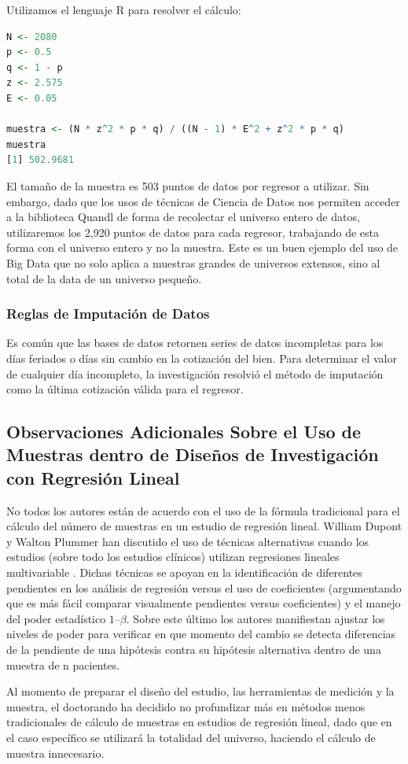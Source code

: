 Utilizamos el lenguaje R para resolver el cálculo:

\begin{lstlisting}[language=R]
N <- 2080
p <- 0.5
q <- 1 - p
z <- 2.575
E <- 0.05

muestra <- (N * z^2 * p * q) / ((N - 1) * E^2 + z^2 * p * q)
muestra
[1] 502.9681
\end{lstlisting}

El tamaño de la muestra es 503 puntos de datos por regresor a utilizar. Sin embargo, dado que los usos de técnicas de Ciencia de Datos nos permiten acceder a la biblioteca Quandl de forma de recolectar el universo entero de datos, utilizaremos los 2,920 puntos de datos para cada regresor, trabajando de esta forma con el universo entero y no la muestra. Este es un buen ejemplo del uso de Big Data \cite{pengMatsui} que no solo aplica a muestras grandes de universos extensos, sino al total de la data de un universo pequeño. 

\subsubsection{Reglas de Imputación de Datos}
Es común que las bases de datos retornen series de datos incompletas para los días feriados o días sin cambio en la cotización del bien. Para determinar el valor de cualquier día incompleto, la investigación resolvió el método de imputación como la última cotización válida para el regresor. 

\subsection{Observaciones Adicionales Sobre el Uso de Muestras dentro de Diseños de Investigación con Regresión Lineal}
No todos los autores están de acuerdo con el uso de la fórmula tradicional para el cálculo del número de muestras en un estudio de regresión lineal. William Dupont y Walton Plummer han discutido el uso de técnicas alternativas cuando los estudios (sobre todo los estudios clínicos) utilizan regresiones lineales multivariable \cite{dupontPlummer}. Dichas técnicas se apoyan en la identificación de diferentes pendientes en los análisis de regresión versus el uso de coeficientes (argumentando que es más fácil comparar visualmente pendientes versus coeficientes) y el manejo del poder estadístico $1 – \beta$. Sobre este último los autores manifiestan ajustar los niveles de poder para verificar en que momento del cambio se detecta diferencias de la pendiente de una hipótesis contra su hipótesis alternativa dentro de una muestra de n pacientes. 

Al momento de preparar el diseño del estudio, las herramientas de medición y la muestra, el doctorando ha decidido no profundizar más en métodos menos tradicionales de cálculo de muestras en estudios de regresión lineal, dado que en el caso específico se utilizará la totalidad del universo, haciendo el cálculo de muestra innecesario. 
